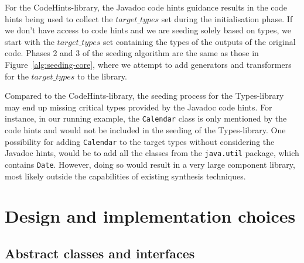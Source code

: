 \documentclass[sigconf,review,anonymous]{acmart}
\begin{document}
For the CodeHints-library, the Javadoc code hints guidance results in the code hints being
used to collect the $target\_types$ set during the initialisation phase.
If we don't have access to code hints and we are seeding solely
based on types, we start with the $target\_types$ set containing
the types %
of the outputs of the original code. %
Phases 2 and 3 of the seeding algorithm are the same as those in Figure~\ref{alg:seeding-core},
where we attempt to add generators and transformers for the $target\_types$ to the library.


Compared to the CodeHints-library, the seeding process for the Types-library may end up missing critical types provided by the Javadoc code hints. For instance, in our running example, the \texttt{Calendar} class is only mentioned by the
code hints and would not be included in the seeding of the Types-library.
One possibility for adding
\texttt{Calendar} to the target types without considering
the Javadoc hints, would be to add all the classes from the
\texttt{java.util} package, which contains \texttt{Date}. However, doing so would result
in a very large component library, most likely outside the capabilities of existing
synthesis techniques.

  \section{Design and implementation choices} \label{sec:implementation}

  

\subsection{Abstract classes and interfaces}\label{sec:abstract}
\end{document}

